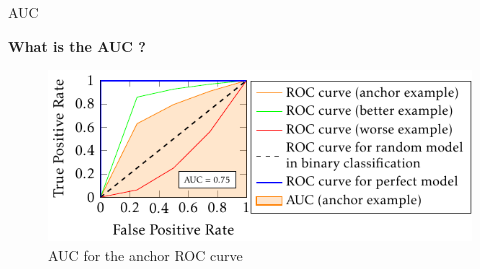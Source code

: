 \begin{frame}{AUC}
    
    {\large\textbf{What is the AUC ?}}

    \begin{figure}
        \centering
        \includegraphics[page=1]{images/output-figure3.pdf}
        \caption{AUC for the anchor ROC curve}
    \end{figure}

                

\end{frame}
